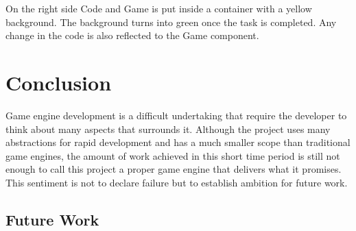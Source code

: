 \documentclass{article}
\begin{document}
On the right side Code and Game is put inside a container with a yellow background. The background turns into green once the task is completed. Any change in the code is also reflected to the Game component.

\clearpage

\section{Conclusion}
Game engine development is a difficult undertaking that require the developer to think about many aspects that surrounds it. Although the project uses many abstractions for rapid development and has a much smaller scope than traditional game engines, the amount of work achieved in this short time period is still not enough to call this project a proper game engine that delivers what it promises. This sentiment is not to declare failure but to establish ambition for future work.


\subsection{Future Work}
\end{document}
